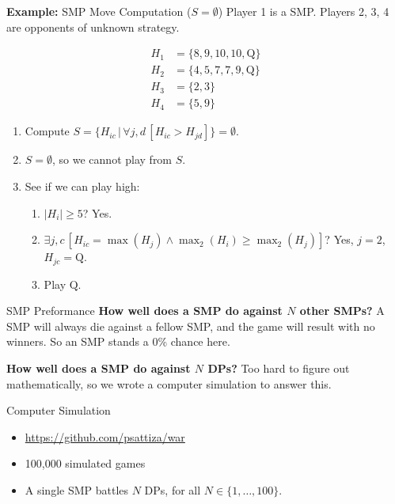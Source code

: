 \documentclass{slides}
\let\geq=\geqslant
\begin{document}
\begin{frame}{\textbf{Example:} SMP Move Computation ($S = \emptyset$)}
    Player 1 is a SMP. Players 2, 3, 4 are opponents of unknown strategy.

    \begin{align*}
        H_1 &= \{8, 9, 10, 10, \mathrm{Q}\} \\
        H_2 &= \{4, 5, 7, 7, 9, \mathrm{Q}\} \\
        H_3 &= \{2, 3\} \\
        H_4 &= \{5, 9\}
    \end{align*}

    \pause

    \begin{enumerate}[<+->]
        \item Compute $S = \{H_{ic} \,|\, \forall j,d\, [H_{ic} >
            H_{jd}]\} = \emptyset$.
        \item $S = \emptyset$, so we cannot play from $S$.
        \item See if we can play high:
            \begin{enumerate}[<+->]
                \item $|H_i| \geq 5$? Yes.
                \item $\exists j,c \,[H_{ic} =
            \max\left(H_{j}\right) \land \max_2\left(H_{i}\right) \geq
                    \max_2\left(H_{j}\right)]$? Yes, $j = 2$, $H_{jc} =
                    \mathrm{Q}$.
                \item Play $\mathrm{Q}$.
            \end{enumerate}
    \end{enumerate}
\end{frame}

\begin{frame}{SMP Preformance}
    \textbf{How well does a SMP do against $N$ other SMPs?} A SMP will always
    die against a fellow SMP, and the game will result with no winners. So an
    SMP stands a 0\% chance here.

    \bigskip
    \pause

    \textbf{How well does a SMP do against $N$ DPs?} Too hard to figure out
    mathematically, so we wrote a computer simulation to answer this.
\end{frame}

\begin{frame}{Computer Simulation}

    \begin{itemize}
        \item \url{https://github.com/psattiza/war}
        \item 100,000 simulated games
        \item A single SMP battles $N$ DPs, for all $N \in \{1, \ldots, 100\}$.
    \end{itemize}
\end{frame}
\end{document}
